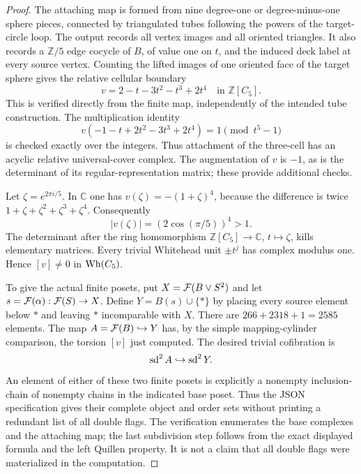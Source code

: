 \begin{proof}
The attaching map is formed from nine degree-one or degree-minus-one
sphere pieces, connected by triangulated tubes following the powers
of the target-circle loop. The output records all vertex images and
all oriented triangles. It also records a $\mathbb Z/5$ edge cocycle
of $B$, of value one on $t$, and the induced deck label at every
source vertex. Counting the lifted images of one oriented face of the
target sphere gives the relative cellular boundary
\[
 v=2-t-3t^2-t^3+2t^4\quad\text{in }\mathbb Z[C_5].
\]
This is verified directly from the finite map, independently of the
intended tube construction. The multiplication identity
\[
 v(-1-t+2t^2-3t^3+2t^4)=1\pmod {t^5-1}
\]
is checked exactly over the integers. Thus attachment of the
three-cell has an acyclic relative universal-cover complex.
The augmentation of $v$ is $-1$, as is the determinant of its
regular-representation matrix; these provide additional checks.

Let $\zeta=e^{2\pi i/5}$. In $\mathbb C$ one has
$v(\zeta)=-(1+\zeta)^4$, because the difference is twice
$1+\zeta+\zeta^2+\zeta^3+\zeta^4$. Consequently
\[
 |v(\zeta)|=(2\cos(\pi/5))^4>1.
\]
The determinant after the ring homomorphism
$\mathbb Z[C_5]\to\mathbb C$, $t\mapsto\zeta$, kills elementary
matrices. Every trivial Whitehead unit $\pm t^j$ has complex modulus
one. Hence $[v]\ne0$ in $\operatorname{Wh}(C_5)$.

To give the actual finite posets, put $X=\mathcal F(B\vee S^2)$ and let
$s=\mathcal F(\alpha):\mathcal F(S)\to X$. Define $Y=B(s)\cup\{\ast\}$ by
placing every source element below $\ast$ and leaving $\ast$
incomparable with $X$. There are $266+2318+1=2585$ elements.
The map $A=\mathcal F(B)\hookrightarrow Y$ has, by the simple
mapping-cylinder comparison, the torsion $[v]$ just computed.
The desired trivial cofibration is
\[
 \operatorname{sd}^2 A\hookrightarrow\operatorname{sd}^2Y.
\]
An element of either of these two finite posets is explicitly a
nonempty inclusion-chain of nonempty chains in the indicated base
poset. Thus the JSON specification gives their complete object and
order sets without printing a redundant list of all double flags.
The verification enumerates the base complexes and the attaching map;
the last subdivision step follows from the exact displayed formula
and the left Quillen property. It is not a claim that all double flags
were materialized in the computation.
\end{proof}

